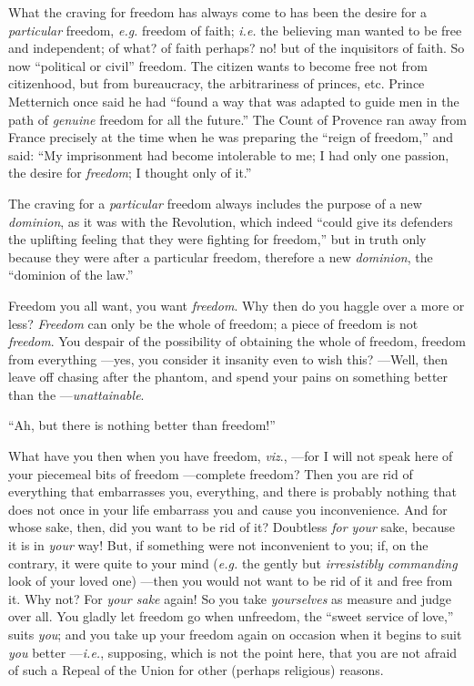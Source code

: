 What the craving for freedom has always come to has been the desire for a 
\textit{particular} freedom, \textit{e.g.} freedom of faith; \textit{i.e.} 
the believing man wanted to be free and independent; of what? of faith 
perhaps? no! but of the inquisitors of faith. So now ``political or civil'' 
freedom. The citizen wants to become free not from citizenhood, but from 
bureaucracy, the arbitrariness of princes, etc. Prince Metternich once said he 
had ``found a way that was adapted to guide men in the path of 
\textit{genuine} freedom for all the future.'' The Count of Provence ran away 
from France precisely at the time when he was preparing the ``reign of 
freedom,'' and said: ``My imprisonment had become intolerable to me; I had 
only one passion, the desire for \textit{freedom}; I thought only of it.''

The craving for a \textit{particular} freedom always includes the purpose of a 
new \textit{dominion}, as it was with the Revolution, which indeed ``could 
give its defenders the uplifting feeling that they were fighting for 
freedom,'' but in truth only because they were after a particular freedom, 
therefore a new \textit{dominion}, the ``dominion of the law.''

Freedom you all want, you want \textit{freedom}. Why then do you haggle over a 
more or less? \textit{Freedom} can only be the whole of freedom; a piece of 
freedom is not \textit{freedom}. You despair of the possibility of obtaining 
the whole of freedom, freedom from everything ---yes, you consider it insanity 
even to wish this? ---Well, then leave off chasing after the phantom, and 
spend your pains on something better than the ---\textit{unattainable}.

``Ah, but there is nothing better than freedom!''

What have you then when you have freedom, \textit{viz}., ---for I will not 
speak here of your piecemeal bits of freedom ---complete freedom? Then you are 
rid of everything that embarrasses you, everything, and there is probably 
nothing that does not once in your life embarrass you and cause you 
inconvenience. And for whose sake, then, did you want to be rid of it? 
Doubtless \textit{for your} sake, because it is in \textit{your} way! But, if 
something were not inconvenient to you; if, on the contrary, it were quite to 
your mind (\textit{e.g.} the gently but \textit{irresistibly commanding} look 
of your loved one) ---then you would not want to be rid of it and free from 
it. Why not? For \textit{your sake} again! So you take \textit{yourselves} as 
measure and judge over all. You gladly let freedom go when unfreedom, the 
``sweet service of love,'' suits \textit{you}; and you take up your freedom 
again on occasion when it begins to suit \textit{you} better ---\textit{i.e.}, 
supposing, which is not the point here, that you are not afraid of such a 
Repeal of the Union for other (perhaps religious) reasons.

